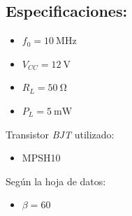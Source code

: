 \documentclass[journal]{IEEEtran}
\begin{document}
\subsection{Especificaciones:}
\begin{itemize}
    \item $f_0=\SI{10}{\mega\hertz}$
    \item $V_{CC}=\SI{12}{\volt}$
    \item $R_L=\SI{50}{\ohm}$
    \item $P_L=\SI{5}{\milli\watt}$
\end{itemize}
Transistor \emph{BJT} utilizado:
\begin{itemize}
    \item MPSH10
\end{itemize}
Según la hoja de datos:
\begin{itemize}
    \item $\beta = 60$
\end{itemize}
\end{document}
